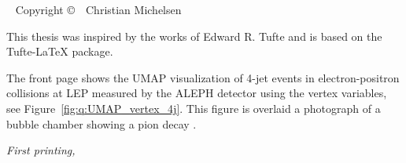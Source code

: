 
\newpage
\begin{fullwidth}
~\vfill
\thispagestyle{empty}
\setlength{\parindent}{0pt}
\setlength{\parskip}{\baselineskip}
Copyright \copyright\ \the\year\ \newline Christian Michelsen

\par{}


This thesis was inspired by the works of Edward R. Tufte and is based on the Tufte-\LaTeX\xspace package. 


\noindent The front page shows the UMAP visualization of 4-jet events in electron-positron collisions at LEP measured by the ALEPH detector using the vertex variables, see Figure~\ref{fig:q:UMAP_vertex_4j}. This figure is overlaid a photograph of a bubble chamber showing a pion decay \autocite{desyBubbleChamberPhotograph}. 

\par\textit{First printing, \monthyear}
\end{fullwidth}